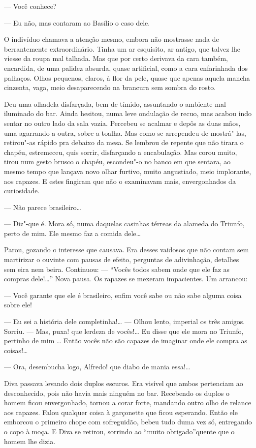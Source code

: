 \begin{linenumbers}
--- Você conhece?

--- Eu não, mas contaram ao Basílio o caso dele.

O indivíduo chamava a atenção mesmo, embora não mostrasse nada de
berrantemente extraordinário. Tinha um ar esquisito, ar antigo, que
talvez lhe viesse da roupa mal talhada. Mas que por certo derivava da
cara também, encardida, de uma palidez absurda, quase artificial, como a
cara enfarinhada dos palhaços. Olhos pequenos, claros, à flor da pele,
quase que apenas aquela mancha cinzenta, vaga, meio desaparecendo na
brancura sem sombra do rosto.

Deu uma olhadela disfarçada, bem de tímido, assuntando o ambiente mal
iluminado do bar. Ainda hesitou, numa leve ondulação de recuo, mas
acabou indo sentar no outro lado da sala vazia. Percebeu se acalmar e
depôs as duas mãos, uma agarrando a outra, sobre a toalha. Mas como se
arrependeu de mostrá"-las, retirou"-as rápido pra debaixo da mesa. Se
lembrou de repente que não tirara o chapéu, estremeceu, quis sorrir,
disfarçando a encabulação. Mas corou muito, tirou num gesto brusco o
chapéu, escondeu"-o no banco em que sentara, ao mesmo tempo que lançava
novo olhar furtivo, muito angustiado, meio implorante, aos rapazes. E
estes fingiram que não o examinavam mais, envergonhados da curiosidade.

--- Não parece brasileiro\ldots{}

--- Diz"-que é. Mora só, numa daquelas casinhas térreas da alameda do
Triunfo, perto de mim. Ele mesmo faz a comida dele\ldots{}

Parou, gozando o interesse que causava. Era desses vaidosos que não
contam sem martirizar o ouvinte com pausas de efeito, perguntas de
adivinhação, detalhes sem eira nem beira. Continuou: --- ``Vocês todos
sabem onde que ele faz as compras dele!\ldots{}'' Nova pausa. Os rapazes se
mexeram impacientes. Um arrancou:

--- Você garante que ele é brasileiro, enfim você sabe ou não sabe
alguma coisa sobre ele!

--- Eu sei a história dele completinha!\ldots{} --- Olhou lento, imperial os
três amigos. Sorriu. --- Mas, puxa! que lerdeza de vocês!\ldots{} Eu disse
que ele mora no Triunfo, pertinho de mim \ldots{} Então vocês não são capazes
de imaginar onde ele compra as coisas!\ldots{}

--- Ora, desembucha logo, Alfredo! que diabo de mania essa!\ldots{}

Diva passava levando dois duplos escuros. Era visível que ambos
pertenciam ao desconhecido, pois não havia mais ninguém no bar.
Recebendo os duplos o homem ficou envergonhado, tornou a corar forte,
mandando outro olho de relance aos rapazes. Falou qualquer coisa à
garçonette que ficou esperando. Então ele emborcou o primeiro chope com
sofreguidão, bebeu tudo duma vez só, entregando o copo à moça. E Diva se
retirou, sorrindo ao ``muito obrigado''quente que o homem lhe dizia.


\end{linenumbers}

